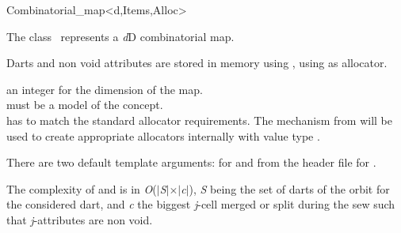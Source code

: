 \ccRefPageBegin

\begin{ccRefClass}{Combinatorial_map<d,Items,Alloc>}


\ccDefinition
  
The class \ccRefName\ represents a \emph{d}D combinatorial map.

Darts and non void attributes are stored in memory using
, using  as allocator.

\ccIsModel
{}

\ccParameters
{} an integer for the dimension of the map.\\
 must be a model of the  concept. \\
 has to match the standard allocator requirements. The   mechanism from  will be used to create appropriate allocators internally with value type .

There are two default template arguments:
 for  and
 from the  header file for .

\ccTypes
{}
\ccGlue
{}


The complexity of  and  is in \emph{O}($|$\emph{S}$|\times|$\emph{c}$|$), \emph{S}
being the set of darts of the orbit
\orbit{\betaun{},\ldots,\betaimdeux{},\betaipdeux{},\ldots,\betad{}} for the
considered dart, and \emph{c} the biggest \emph{j}-cell merged or
split during the sew such that \emph{j}-attributes are non void.



\end{ccRefClass}
